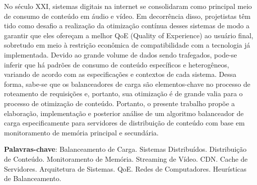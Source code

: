 
\setlength{\absparsep}{18pt} %
\begin{resumo}
No século XXI, sistemas digitais na internet se consolidaram como principal meio de consumo de conteúdo em áudio e vídeo.
%
Em decorrência disso, projetistas têm tido como desafio a realização da otimização contínua desses sistemas de modo a garantir que eles ofereçam a melhor QoE (Quality of Experience) ao usuário final, sobretudo em meio à restrição econômica de compatibilidade com a tecnologia já implementada.
%
Devido ao grande volume de dados sendo trafegados, pode-se inferir que há padrões de consumo de conteúdo específicos e heterogêneos, variando de acordo com as especificações e contextos de cada sistema.
%
Dessa forma, sabe-se que os balanceadores de carga são elementos-chave no processo de roteamento de requisições e, portanto, sua otimização é de grande valia para o processo de otimização de conteúdo.
%
Portanto, o presente trabalho propõe a elaboração, implementação e posterior análise de um algoritmo balanceador de carga especificamente para servidores de distribuição de conteúdo com base em monitoramento de memória principal e secundária.

 \textbf{Palavras-chave}: 
 Balanceamento de Carga.
 Sistemas Distribuídos.
 Distribuição de Conteúdo.
 Monitoramento de Memória.
 Streaming de Vídeo.
 CDN.
 Cache de Servidores.
 Arquitetura de Sistemas.
 QoE. Redes de Computadores.
 Heurísticas de Balanceamento.
\end{resumo}
